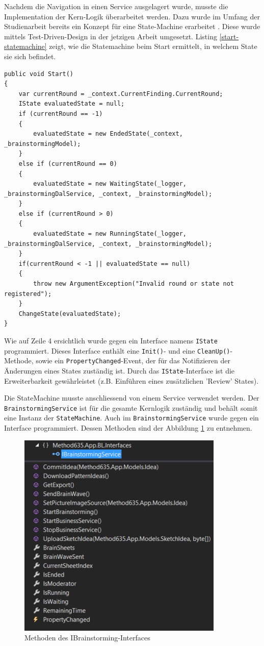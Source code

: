 Nachdem die Navigation in einen Service ausgelagert wurde, musste die Implementation der Kern-Logik überarbeitet werden. Dazu wurde im Umfang der Studienarbeit bereits ein Konzept für eine State-Machine erarbeitet \cite{methode635-sa}. Diese wurde mittels Test-Driven-Design in der jetzigen Arbeit umgesetzt. Listing \ref{start-statemachine} zeigt, wie die Statemachine beim Start ermittelt, in welchem State sie sich befindet.
\begin{lstlisting}[caption=Start der Klasse StateMachine, label=start-statemachine]
public void Start()
{
	var currentRound = _context.CurrentFinding.CurrentRound;
	IState evaluatedState = null;
	if (currentRound == -1)
	{
		evaluatedState = new EndedState(_context, _brainstormingModel);
	}
	else if (currentRound == 0)
	{
		evaluatedState = new WaitingState(_logger, _brainstormingDalService, _context, _brainstormingModel);
	}
	else if (currentRound > 0)
	{
		evaluatedState = new RunningState(_logger, _brainstormingDalService, _context, _brainstormingModel);
	}
	if(currentRound < -1 || evaluatedState == null)
	{
		throw new ArgumentException("Invalid round or state not registered");
	}
	ChangeState(evaluatedState);
}
\end{lstlisting}
Wie auf Zeile 4 ersichtlich wurde gegen ein Interface namens \texttt{IState} programmiert. Dieses Interface enthält eine \texttt{Init()}- und eine \texttt{CleanUp()}-Methode, sowie ein \texttt{PropertyChanged}-Event, der für das Notifizieren der Änderungen eines States zuständig ist. Durch das \texttt{IState}-Interface ist die Erweiterbarkeit gewährleistet (z.B. Einführen eines zusätzlichen 'Review' States). 

Die StateMachine musste anschliessend von einem Service verwendet werden. Der \texttt{BrainstormingService} ist für die gesamte Kernlogik zuständig und behält somit eine Instanz der \texttt{StateMachine}. Auch im \texttt{BrainstormingService} wurde gegen ein Interface programmiert. Dessen Methoden sind der Abbildung \ref{fig:ibrainstormingservice} zu entnehmen.

\begin{figure}[h]
	\centering
	\includegraphics[width=0.5\linewidth]{img/techn-bericht/ibrainstormingservice}
	\caption{Methoden des IBrainstorming-Interfaces}
	\label{fig:ibrainstormingservice}
\end{figure}

